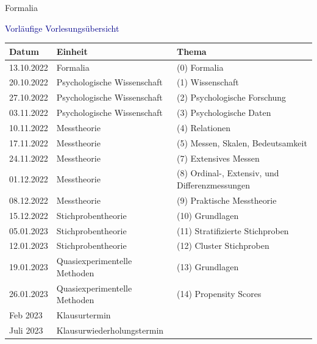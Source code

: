 \documentclass[
  8pt,
  ignorenonframetext,
]{beamer}
\begin{document}
\begin{frame}[t]{Formalia}
\protect\hypertarget{formalia}{}
\vspace{1mm}

\textcolor{darkblue}{Vorläufige Vorlesungsübersicht} \vspace{2mm}

\small
\center
\footnotesize
\renewcommand{\arraystretch}{1.1}
\begin{tabular}{lll}
Datum        & Einheit                       & Thema                                                    \\\hline
13.10.2022   & Formalia                      & (0) Formalia                                     \\
20.10.2022   & Psychologische Wissenschaft   & (1) Wissenschaft                                 \\
27.10.2022   & Psychologische Wissenschaft   & (2) Psychologische Forschung                     \\
03.11.2022   & Psychologische Wissenschaft   & (3) Psychologische Daten                         \\
10.11.2022   & Messtheorie                   & (4) Relationen                                   \\
17.11.2022   & Messtheorie                   & (5) Messen, Skalen, Bedeutsamkeit                \\
24.11.2022   & Messtheorie                   & (7) Extensives Messen                            \\
01.12.2022   & Messtheorie                   & (8) Ordinal-, Extensiv, und Differenzmessungen   \\
08.12.2022   & Messtheorie                   & (9) Praktische Messtheorie                       \\
15.12.2022   & Stichprobentheorie            & (10) Grundlagen                                  \\
05.01.2023   & Stichprobentheorie            & (11) Stratifizierte Stichproben                  \\
12.01.2023   & Stichprobentheorie            & (12) Cluster Stichproben                         \\
19.01.2023   & Quasiexperimentelle Methoden  & (13) Grundlagen                                  \\
26.01.2023   & Quasiexperimentelle Methoden  & (14) Propensity Scores                           \\\hline
Feb  2023    & Klausurtermin                 &                                                  \\
Juli 2023    & Klausurwiederholungstermin    &
\end{tabular}
\end{frame}
\end{document}
